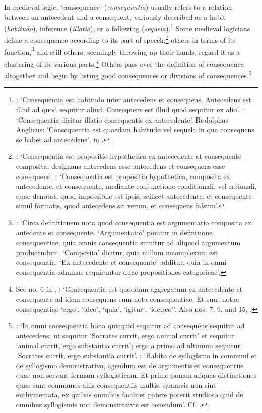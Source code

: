 \documentclass[]{article}
\begin{document}
In medieval logic, `consequence' (\textit{consequentia}) usually refers to a relation between an antecedent and a consequent, variously described as a habit (\textit{habitudo}), inference (\textit{illatio}), or a following (\textit{sequela}).\footnote{\autocite[I, par. 1, p. 4]{Green-Pedersen1980a}: `Consequentia est habitudo inter antecedens et consequens. Antecedens est illud ad quod sequitur aliud. Consequens est illud quod sequitur ex alio'. \autocite[1.1.01, p. 1]{StrodeConsequentiis}: `Consequentia dicitur illatio consequentis ex antecedente'. Rodolphus Anglicus: `Consequentia est quaedam habitudo vel sequela in qua consequens se habet ad antecedens', in \autocite[p. 306]{Green-Pedersen1983}.} Some medieval logicians define a consequence according to its part of speech,\footnote{\autocite[I, c. 3, p. 22.60-62]{BuridanTC}: `Consequentia est propositio hypothetica ex antecedente et consequente composita, designans antecedens esse antecedens et consequens esse consequens'. \autocite[I. q. 10, pp. 104-105]{Pseudo-Scotus1891}: `Consequentia est propositio hypothetica, composita ex antecedente, et consequente, mediante conjunctione conditionali, vel rationali, quae denotat, quod impossibile est ipsis, scilicet antecedente, et consequente simul formatis, quod antecedens sit verum, et consequens falsum'.} others in terms of its function,\footnote{\autocite[A.I, par. 2, p. 92]{Green-Pedersen1982}: `Circa definitionem nota quod consequentia est argumentatio composita ex antedente et consequente. `Argumentatio' ponitur in definitione consequentiae, quia omnis consequentia sumitur ad aliquod argumentum producendum. `Composita' dicitur, quia nullum incomplexum est consequentia. `Ex antecedente et consequente' additur, quia in omni consequentia adminus requiruntur duae propositiones categoricae'.} and still others, seemingly throwing up their hands, regard it as a clustering of its various parts.\footnote{See no. 6 in \autocite[p. 300]{Green-Pedersen1983}, : `Consequentia est quoddam aggregatum ex antecedente et consequente ad idem consequens cum nota consequentiae. Et sunt notae consequentiae `ergo', `ideo', `quia', `igitur', `idcirco''. Also nos. 7, 9, and 15, \autocite[300-306]{Green-Pedersen1983}.} Others pass over the definition of consequence altogether and begin by listing good consequences or divisions of consequences.\footnote{\autocite[II, par. 1, p. 11]{Green-Pedersen1980a}: `In omni consequentia bona quicquid sequitur ad consequens sequitur ad antecedens; ut sequitur `Socrates currit, ergo animal currit' et sequitur `animal currit, ergo substantia currit'; ergo a primo ad ultimum sequitur `Socrates currit, ergo substantia currit'. \autocite[III-3, c. 1, 587.4-9]{OckhamSL}: `Habito de syllogismo in communi et de syllogismo demonstrativo, agendum est de argumentis et consequentiis quae non servant formam syllogisticam. Et primo ponam aliquas distinctiones quae sunt communes aliis consequentiis multis, quamvis non sint enthymemata, ex quibus omnibus faciliter patere poterit studioso quid de omnibus syllogismis non demonstrativis est tenendum'. Cf. \autocite[262]{Pozzi1978}.}
\end{document}

